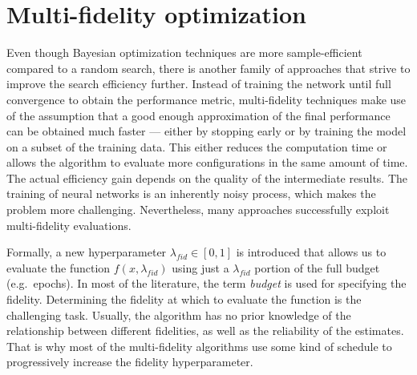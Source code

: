 \chapter{Multi-fidelity optimization}

Even though Bayesian optimization techniques are more sample-efficient compared to a random search, there is another family of approaches that strive to improve the search efficiency further. Instead of training the network until full convergence to obtain the performance metric, multi-fidelity techniques make use of the assumption that a good enough approximation of the final performance can be obtained much faster --- either by stopping early or by training the model on a subset of the training data. This either reduces the computation time or allows the algorithm to evaluate more configurations in the same amount of time. The actual efficiency gain depends on the quality of the intermediate results. The training of neural networks is an inherently noisy process, which makes the problem more challenging. Nevertheless, many approaches successfully exploit multi-fidelity evaluations.

Formally, a new hyperparameter $\lambda_{fid}\in [0,1]$ is introduced that allows us to evaluate the function $f(x, \lambda_{fid})$ using just a $\lambda_{fid}$ portion of the full budget (e.g.\ epochs). In most of the literature, the term \textit{budget} is used for specifying the fidelity. Determining the fidelity at which to evaluate the function is the challenging task. Usually, the algorithm has no prior knowledge of the relationship between different fidelities, as well as the reliability of the estimates. That is why most of the multi-fidelity algorithms use some kind of schedule to progressively increase the fidelity hyperparameter.


